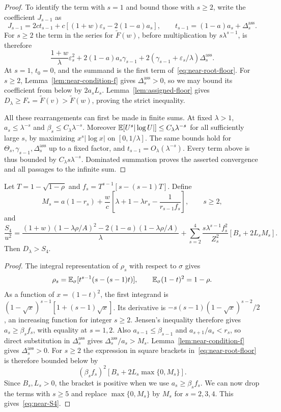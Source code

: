 \begin{proof}
To identify the term with $s=1$ and bound those with $s\ge2$, write the coefficient $J_{s-1}$ as
\[
 J_{s-1}=2ct_{s-1}+c[(1+w)\varepsilon_s-2(1-a)a_s],
 \qquad t_{s-1}=(1-a)a_s+\Delta_s^{\mathrm{ass}}.
\]
For $s\ge2$ the term in the series for $\widetilde F(w)$, before multiplication by $s\lambda^{s-1}$, is therefore
\[
 \frac{1+w}{\lambda}\varepsilon_s^2+2(1-a)a_s\gamma_{s-1}
       +2(\gamma_{s-1}+\varepsilon_s/\lambda)\Delta_s^{\mathrm{ass}}.
\]
At $s=1$, $t_0=0$, and the summand is the first term of~\eqref{eq:near-root-floor}. For $s\ge2$, Lemma~\ref{lem:near-condition-f} gives $\Delta_s^{\mathrm{ass}}>0$, so we may bound its coefficient from below by $2a_sL_s$. Lemma~\ref{lem:assigned-floor} gives
$D_\lambda\ge F_*=\widetilde F(v)>\widetilde F(w)$, proving the strict inequality.

All these rearrangements can first be made in finite sums. At fixed $\lambda>1$, $a_s\le\lambda^{-s}$ and $\beta_s\le C_\lambda\lambda^{-s}$. Moreover $\mathbb E[U^s|\log U|]\le C_\lambda\lambda^{-s}$ for all sufficiently large $s$, by maximizing $x^s|\log x|$ on $[0,1/\lambda]$. The same bounds hold for $\Theta_s,\gamma_{s-1},\Delta_s^{\mathrm{ass}}$ up to a fixed factor, and $t_{s-1}=O_\lambda(\lambda^{-s})$. Every term above is thus bounded by $C_\lambda s\lambda^{-s}$. Dominated summation proves the asserted convergence and all passages to the infinite sum.
\end{proof}

\begin{lemma}\label{lem:near-four-age}
Let $T=1-\sqrt{1-\rho}$ and $f_s=T^{s-1}[s-(s-1)T]$. Define
\[
 M_s=a(1-r_s)+\frac wc\left[\lambda+1-\lambda r_s-
                              \frac1{r_{s-1}f_s}\right],\qquad s\ge2,
\]
and
\begin{equation}\label{eq:near-S4}
 \frac{S_4}{u^2}=
 \frac{(1+w)(1-\lambda\rho/A)^2-2(1-a)(1-\lambda\rho/A)}\lambda
 +\sum_{s=2}^4\frac{s\lambda^{s-1}f_s^2}{Z_s^2}[B_s+2L_sM_s].
\end{equation}
Then $D_\lambda>S_4$.
\end{lemma}
\begin{proof}
The integral representation of $\rho_s$ with respect to $\sigma$ gives
\[
 \rho_s=\mathbb E_\sigma[t^{s-1}(s-(s-1)t)],\qquad
 \mathbb E_\sigma(1-t)^2=1-\rho.
\]
As a function of $x=(1-t)^2$, the first integrand is
$(1-\sqrt x)^{s-1}[1+(s-1)\sqrt x]$. Its derivative is
$-s(s-1)(1-\sqrt x)^{s-2}/2$, an increasing function for integer $s\ge2$.
Jensen's inequality therefore gives $a_s\ge\beta_sf_s$, with equality at $s=1,2$. Also $a_{s-1}\le\beta_{s-1}$ and $a_{s+1}/a_s<r_s$, so direct substitution in $\Delta_s^{\mathrm{ass}}$ gives $\Delta_s^{\mathrm{ass}}/a_s>M_s$. Lemma~\ref{lem:near-condition-f} gives $\Delta_s^{\mathrm{ass}}>0$. For $s\ge2$ the expression in square brackets in~\eqref{eq:near-root-floor} is therefore bounded below by
\[
 (\beta_sf_s)^2[B_s+2L_s\max\{0,M_s\}].
\]
Since $B_s,L_s>0$, the bracket is positive when we use $a_s\ge\beta_sf_s$. We can now drop the terms with $s\ge5$ and replace $\max\{0,M_s\}$ by $M_s$ for $s=2,3,4$. This gives~\eqref{eq:near-S4}.
\end{proof}

